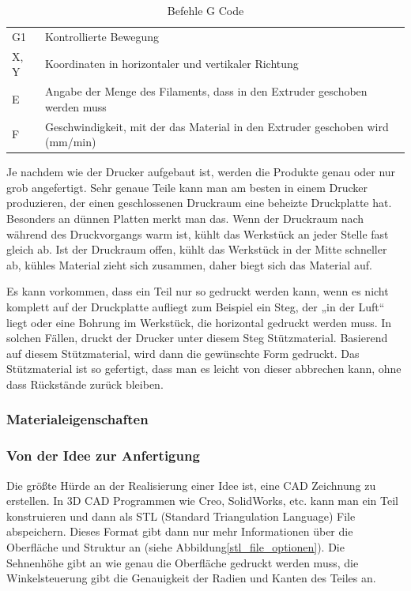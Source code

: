 			\begin{table}[htbp]
  		\centering
  		\caption{Befehle G Code}
	    \begin{tabular}{ll}
	    G1    & Kontrollierte Bewegung \\
	    X, Y  & Koordinaten in horizontaler und vertikaler Richtung \\
	    E     & Angabe der Menge des Filaments, dass in den Extruder geschoben werden muss \\
	    F     & Geschwindigkeit, mit der das Material in den Extruder geschoben wird (mm/min) \\
	    \end{tabular}%
	  	\label{tab:befehle gcode}%
			\end{table}%

		Je nachdem wie der Drucker aufgebaut ist, werden die Produkte genau oder nur grob angefertigt. Sehr genaue Teile kann man am besten in einem Drucker produzieren, der einen geschlossenen Druckraum \bzw eine beheizte Druckplatte hat.
		Besonders an dünnen Platten merkt man das. Wenn der Druckraum nach \bzw während des Druckvorgangs warm ist, kühlt das Werkstück an jeder Stelle fast gleich ab.
		Ist der Druckraum offen, kühlt das Werkstück in der Mitte schneller ab, kühles Material zieht sich zusammen, daher biegt sich das Material auf.

			\newpage

		Es kann vorkommen, dass ein Teil nur so gedruckt werden kann, wenn es nicht komplett auf der Druckplatte aufliegt zum Beispiel ein Steg, der „in der Luft“ liegt oder eine Bohrung im Werkstück, die horizontal gedruckt werden muss.
		In solchen Fällen, druckt der Drucker unter diesem Steg Stützmaterial. Basierend auf diesem Stützmaterial, wird dann die gewünschte Form gedruckt.
		Das Stützmaterial ist so gefertigt, dass man es leicht von dieser abbrechen kann, ohne dass Rückstände zurück bleiben.

		\subsubsection{Materialeigenschaften}

		\subsubsection{Von der Idee zur Anfertigung}

		Die größte Hürde an der Realisierung einer Idee ist, eine CAD Zeichnung zu erstellen. In 3D CAD Programmen wie Creo, SolidWorks, etc. kann man ein Teil konstruieren und dann als STL (Standard Triangulation Language) File abspeichern.
		Dieses Format gibt dann nur mehr Informationen über die Oberfläche und Struktur an (siehe Abbildung\ref{stl_file_optionen}).
		Die Sehnenhöhe gibt an wie genau die Oberfläche gedruckt werden muss, die Winkelsteuerung gibt die Genauigkeit der Radien und Kanten des Teiles an.


